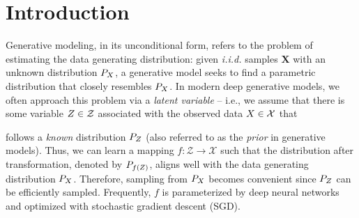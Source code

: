 \newcommand{\var}[1]{\uppercase{#1}}
\newcommand{\spc}[1]{\mathcal{#1}}
\makeatletter
\newcommand*{\rsimdots}{%
  \mathrel{%
    \mathpalette\@rsimdots{}%
  }%
}
\newcommand*{\@rsimdots}[2]{%
  \sbox0{$#1\sim\m@th$}%
  \sbox2{$#1\vcenter{}$}%
  \dimen@=.75\ht2\relax %
  \sbox2{$#1\cdot\m@th$}%
  \sbox2{%
    \rlap{\raisebox{\dimen@}{\copy2}}%
    \raisebox{-\dimen@}{\copy2}%
  }%
  \sbox2{$#1\rotatebox[origin=c]{-45}{\copy2}$}%
  \rlap{\hbox to \wd0{\hss\copy2\hss}}%
  \copy0 %
}
\makeatother

\section{Introduction}
Generative modeling, in its unconditional form, refers to the problem of estimating the data generating distribution: given \textit{i.i.d.} samples $\mathbf{X}$ with an unknown distribution $P_{\var{x}}$, a generative model seeks to 
find a parametric distribution that closely resembles $P_{\var{x}}$. In modern deep generative models, 
we often approach this problem via a {\em latent variable} -- i.e., we assume that there is some variable $\var{z} \in \spc{Z}$ 
associated with the observed data $\var{x} \in \spc{X}$ that 

follows a {\em known} distribution $P_{\var{z}}$ (also referred to as the \textit{prior} in generative models). Thus, we can learn a mapping $f: \spc{Z} \to \spc{X}$ such that the distribution after transformation, denoted by $P_{f(\var{z})}$, aligns well with the data generating distribution $P_{\var{x}}$. Therefore, sampling from $P_{\var{X}}$ becomes convenient since $P_{\var{Z}}$ can be efficiently sampled. Frequently, $f$ is parameterized by deep neural networks and optimized with stochastic gradient descent (SGD).

